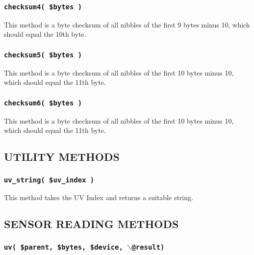 \documentclass[12pt,a4paper]{article}
\begin{document}
\subsubsection*{\texttt{checksum4( \$bytes )}\label{xPL::RF::Oregon_checksum4_bytes_}}


This method is a byte checksum of all nibbles of the first 9 bytes
minus 10, which should equal the 10th byte.

\subsubsection*{\texttt{checksum5( \$bytes )}\label{xPL::RF::Oregon_checksum5_bytes_}}


This method is a byte checksum of all nibbles of the first 10 bytes
minus 10, which should equal the 11th byte.

\subsubsection*{\texttt{checksum6( \$bytes )}\label{xPL::RF::Oregon_checksum6_bytes_}}


This method is a byte checksum of all nibbles of the first 10 bytes
minus 10, which should equal the 11th byte.

\subsection*{UTILITY METHODS\label{xPL::RF::Oregon_UTILITY_METHODS}}
\subsubsection*{\texttt{uv\_string( \$uv\_index )}\label{xPL::RF::Oregon_uv_string_uv_index_}}


This method takes the UV Index and returns a suitable string.

\subsection*{SENSOR READING METHODS\label{xPL::RF::Oregon_SENSOR_READING_METHODS}}
\subsubsection*{\texttt{uv( \$parent, \$bytes, \$device, $\backslash$@result)}\label{xPL::RF::Oregon_uv_parent_bytes_device_backslash_result_}}
\end{document}
